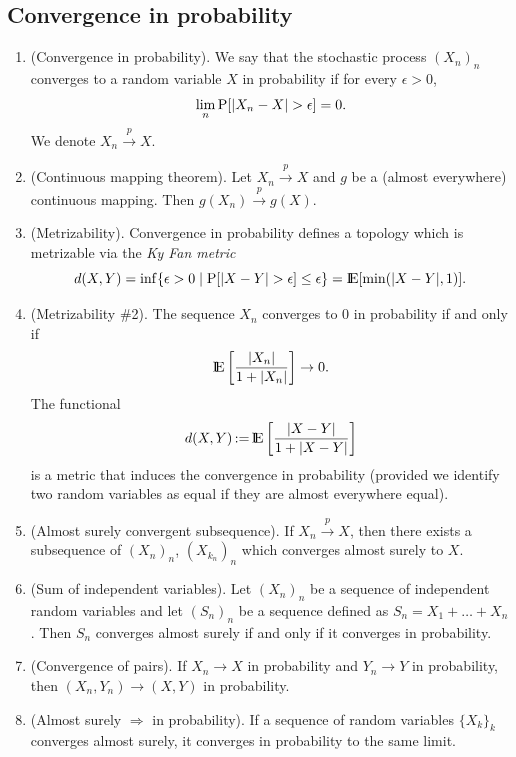 \documentclass[a4paper,10pt]{article}
\begin{document}
\subsection{Convergence in probability}       
\begin{enumerate}
 \item (Convergence in probability). We say that the stochastic process $(X_n)_n$ converges to a random variable $X$
       in probability if for every $\epsilon>0$,
       \[
        \lim_n \prob[|X_n-X|>\epsilon] = 0.
       \]
       We denote $X_n \overset{p}{\to} X$.
 \item (Continuous mapping theorem). Let $X_n \overset{p}{\to} X$ and $g$ be a (almost everywhere) continuous mapping. Then
       $g(X_n) \overset{p}{\to} g(X)$.
 \item (Metrizability). Convergence in probability defines a topology which is metrizable via the \textit{Ky Fan metric}
      \[
	d(X,Y) = \inf \{\epsilon>0 {}\mid{} \prob[|X-Y|>\epsilon]\leq \epsilon\} = \E[\min(|X-Y|,1)].
      \]
 \item (Metrizability \#2). 
       The sequence $X_n$ converges to $0$ in probability if and only if
       \[
        \E\left[ \frac{|X_n|}{1+|X_n|}\right] \to 0.
       \]
       The functional 
       \[
        d(X,Y) \dfn \E\left[ \frac{|X - Y|}{1+|X - Y|}\right]
       \]
       is a metric that induces the convergence in probability (provided we identify two random variables
       as equal if they are almost everywhere equal).
 \item (Almost surely convergent subsequence). 
       If $X_n \overset{p}{\to} X$, then there exists a subsequence of $(X_n)_n$, 
       $(X_{k_n})_n$ which converges almost surely to $X$.
       
 \item (Sum of independent variables). Let $(X_n)_n$ be a sequence of independent random 
       variables and let $(S_n)_n$ be a sequence defined as $S_n = X_1 + \ldots + X_n$.
       Then $S_n$ converges almost surely if and only if it converges in probability.      
 
 \item (Convergence of pairs). If $X_n\to X$ in probability and $Y_n\to Y$ in probability, then
       $(X_n, Y_n)\to (X,Y)$ in probability.
       
 \item (Almost surely $\Rightarrow$ in probability). If a sequence of random variables $\{X_k\}_k$ 
       converges almost surely, it converges in probability to the same limit.
       

\end{enumerate}
\end{document}
